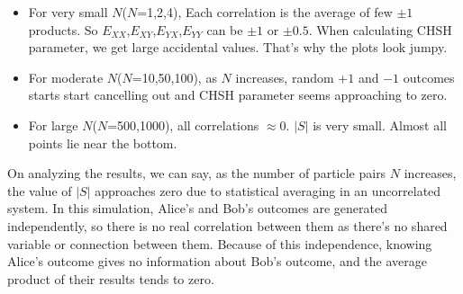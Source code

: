 \documentclass[17pt,a4paper]{extarticle}
\begin{document}
\begin{itemize}
    \item For very small $N$($N$=1,2,4), Each correlation is the average of few $\pm1$ products. So $E_{XX}$,$E_{XY}$,$E_{YX}$,$E_{YY}$ can be $\pm1$ or $\pm0.5$. When calculating CHSH parameter, we get large accidental values. That's why the plots look jumpy.
    \item For moderate $N$($N$=10,50,100), as $N$ increases, random $+1$ and $-1$ outcomes starts start cancelling out and CHSH parameter seems approaching to zero.
    \item For large $N$($N$=500,1000), all correlations $\approx 0$. $|S|$ is very small. Almost all points lie near the bottom.
\end{itemize}
On analyzing the results, we can say, as the number of particle pairs $N$ increases, the value of $|S|$ approaches zero due to statistical averaging in an uncorrelated system. In this simulation, Alice’s and Bob’s outcomes are generated independently, so there is no real correlation between them as there's no shared variable or connection between them. Because of this independence, knowing Alice’s outcome gives no information about Bob’s outcome, and the average product of their results tends to zero.
\end{document}

